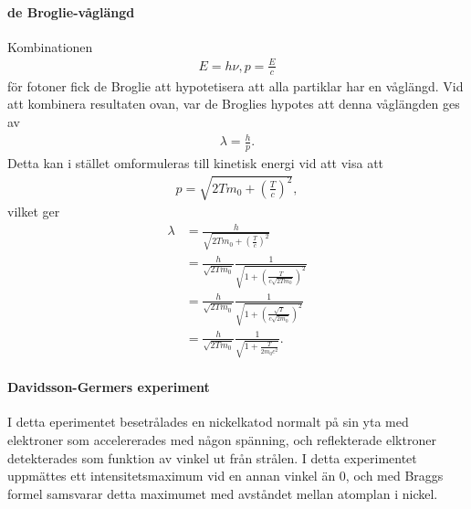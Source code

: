 \paragraph{de Broglie-våglängd}
Kombinationen
\begin{align*}
	E = h\nu, p = \frac{E}{c}
\end{align*}
för fotoner fick de Broglie att hypotetisera att alla partiklar har en våglängd. Vid att kombinera resultaten ovan, var de Broglies hypotes att denna våglängden ges av
\begin{align*}
	\lambda = \frac{h}{p}.
\end{align*}
Detta kan i stället omformuleras till kinetisk energi vid att visa att
\begin{align*}
	p = \sqrt{2Tm_{0} + \left(\frac{T}{c}\right)^{2}},
\end{align*}
vilket ger
\begin{align*}
	\lambda &= \frac{h}{\sqrt{2Tm_{0} + \left(\frac{T}{c}\right)^{2}}} \\
	        &= \frac{h}{\sqrt{2Tm_{0}}}\frac{1}{\sqrt{1 + \left(\frac{T}{c\sqrt{2Tm_{0}}}\right)^{2}}} \\
	        &= \frac{h}{\sqrt{2Tm_{0}}}\frac{1}{\sqrt{1 + \left(\frac{\sqrt{T}}{c\sqrt{2m_{0}}}\right)^{2}}} \\
	        &= \frac{h}{\sqrt{2Tm_{0}}}\frac{1}{\sqrt{1 + \frac{T}{2m_{0}c^{2}}}}.
\end{align*}

\paragraph{Davidsson-Germers experiment}
I detta eperimentet besetrålades en nickelkatod normalt på sin yta med elektroner som accelererades med någon spänning, och reflekterade elktroner detekterades som funktion av vinkel ut från strålen. I detta experimentet uppmättes ett intensitetsmaximum vid en annan vinkel än $0$, och med Braggs formel samsvarar detta maximumet med avståndet mellan atomplan i nickel.

